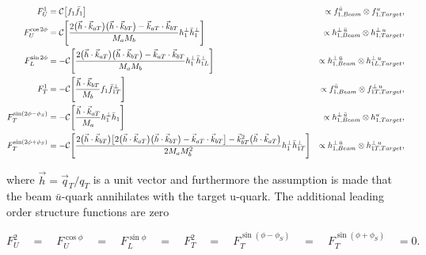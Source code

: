 \begin{align}
  \label{equ::DY_fU1}
  F_{U}^{1} &  =  
  {\cal C}  \big[ f_{1}  \bar{f}_{1} \big]
  &\propto f^{\bar{u}}_{1,Beam} \otimes f^u_{1,Target}, \\
  \label{equ::DY_fUcos2phi}
  F_{U}^{\cos 2\phi} &  =  
  {\cal C}  \Bigg[ \frac{2\big( \vec{h} \cdot \vec{k}_{aT} \big) 
                          \big( \vec{h} \cdot \vec{k}_{bT} \big)
                         - \vec{k}_{aT} \cdot \vec{k}_{bT}} {M_{a} M_{b}}  
    h_{1}^{\perp}  \bar{h}_{1}^{\perp} \Bigg]
  &\propto h^{\perp \, \bar{u}}_{1,Beam} \otimes h^{\perp \, u}_{1,Target}, \\
F_{L}^{\sin 2\phi} &  =  
-  {\cal C}  \Bigg[ \frac{2\big( \vec{h} \cdot \vec{k}_{aT} \big) 
                          \big( \vec{h} \cdot \vec{k}_{bT} \big)
                         - \vec{k}_{aT} \cdot \vec{k}_{bT}} {M_{a} M_{b}}  
                  h_{1}^{\perp}  \bar{h}_{1L}^{\perp} \Bigg]
&\propto h^{\perp \, \bar{u}}_{1,Beam} \otimes h^{\perp \, u}_{1L,Target}, \\
F_{T}^{1} &  =   
- {\cal C}  \Bigg[ \frac{\vec{h} \cdot \vec{k}_{bT}} {M_{b}}  
  f_{1}  \bar{f}_{1T}^{\perp} \Bigg]
&\propto f^{\bar{u}}_{1,Beam} \otimes f^{\perp \, u}_{1T,Target}, \\
F_{T}^{\sin (2\phi - \phi_S)} &  =  
-  {\cal C}  \Bigg[ \frac{\vec{h} \cdot \vec{k}_{aT}} {M_{a}} 
  h_{1}^{\perp}  \bar{h}_{1} \Bigg]
&\propto h^{\perp \, \bar{u}}_{1,Beam} \otimes h^{u}_{1,Target}, \\
\label{equ::DY_fTsin2phiphiS}
F_{T}^{\sin (2\phi + \phi_S)} &  =  
-  {\cal C}  \Bigg[ \frac{2\big( \vec{h} \cdot \vec{k}_{bT} \big)
                    \big[2 \big( \vec{h} \cdot\vec{k}_{aT} \big)
                         \big( \vec{h} \cdot \vec{k}_{bT} \big)
                        -\vec{k}_{aT} \cdot \vec{k}_{bT} \big]
                   - \vec{k}_{bT}^{2} \big( \vec{h} \cdot \vec{k}_{aT} \big)}
                  {2 M_{a} M_{b}^{2}}  
                  h_{1}^{\perp}  \bar{h}_{1T}^{\perp} \Bigg]
&\propto h^{\perp \, \bar{u}}_{1,Beam} \otimes h^{\perp \, u}_{1T,Target},
\end{align}

\noindent
where $\vec{h} = \vec{q}_T/q_T$ is a unit vector and furthermore the assumption
is made that the beam $\bar{u}$-quark annihilates with the target u-quark.  The
additional leading order structure functions are zero

\begin{equation}
  F_{U}^{2} \quad = \quad F_{U}^{\cos\phi} \quad = \quad F_{L}^{\sin\phi} \quad
  = \quad F_{T}^{2} \quad = \quad F_{T}^{\sin(\phi - \phi_S)} \quad = \quad
  F_{T}^{\sin(\phi + \phi_S)} \quad = 0.
\end{equation}

